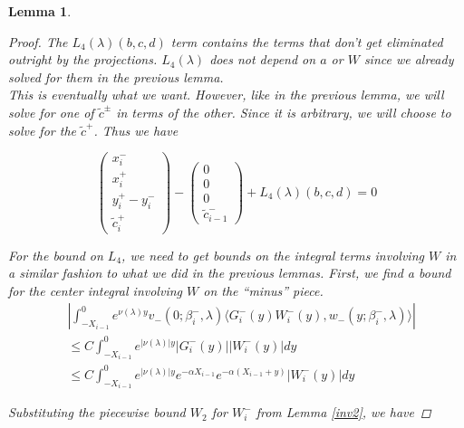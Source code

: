 \documentclass[12pt]{article}
\newtheorem{lemma}{Lemma}
\begin{document}
\begin{lemma}
\begin{proof}
The $L_4(\lambda)(b, c, d)$ term contains the terms that don't get eliminated outright by the projections. $L_4(\lambda)$ does not depend on $a$ or $W$ since we already solved for them in the previous lemma. \\

This is eventually what we want. However, like in the previous lemma, we will solve for one of $\tilde{c}^\pm$ in terms of the other. Since it is arbitrary, we will choose to solve for the $\tilde{c}^+$. Thus we have

\[
\begin{pmatrix}x_i^- \\ x_i^+ \\ 
y_i^+ - y_i^- \\ 
\tilde{c}_i^+ \end{pmatrix} -
\begin{pmatrix}0\\0\\0\\ \tilde{c}_{i-1}^- \end{pmatrix}
+ L_4(\lambda)(b, c, d) = 0
\]

For the bound on $L_4$, we need to get bounds on the integral terms involving $W$ in a similar fashion to what we did in the previous lemmas. First, we find a bound for the center integral involving $W$ on the ``minus'' piece.\\

\begin{align*}
&\left| \int_{-X_{i-1}}^0
e^{\nu(\lambda)y} v_-(0; \beta_i^-, \lambda) \langle G_i^-(y)W_i^-(y), w_-(y; \beta_i^-, \lambda) \rangle \right| \\
&\leq C \int_{-X_{i-1}}^0 e^{|\nu(\lambda)|y} |G_i^-(y)| |W_i^-(y)| dy \\
&\leq C \int_{-X_{i-1}}^0 e^{|\nu(\lambda)|y} e^{-\alpha X_{i-1}} e^{-\alpha(X_{i-1} + y)} |W_i^-(y)| dy
\end{align*}

Substituting the piecewise bound $W_2$ for $W_i^-$ from Lemma \ref{inv2}, we have


\end{proof}
\end{lemma}
\end{document}
